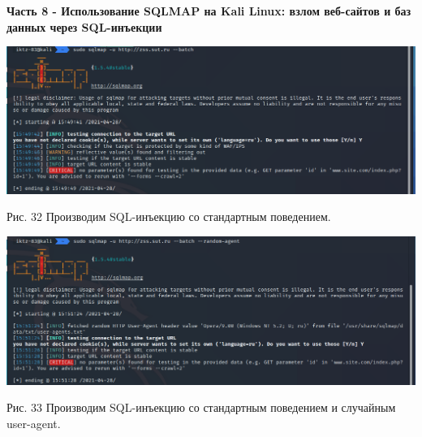 \documentclass[a4paper,14pt]{extarticle}
\begin{document}
    \textbf{Часть 8 - Использование SQLMAP на Kali Linux: взлом веб-сайтов и
баз данных через SQL-инъекции}
    \begin{center}
        \includegraphics[scale=0.4]{pics/32.png}

        Рис. 32 Производим SQL-инъекцию со стандартным поведением.
        \vspace{1ex}

        \includegraphics[scale=0.4]{pics/33.png}

        \begin{singlespace}
            Рис. 33 Производим SQL-инъекцию со стандартным поведением и случайным user-agent. 
        \vspace{1ex}
        \end{singlespace}

    \end{center}
\end{document}
